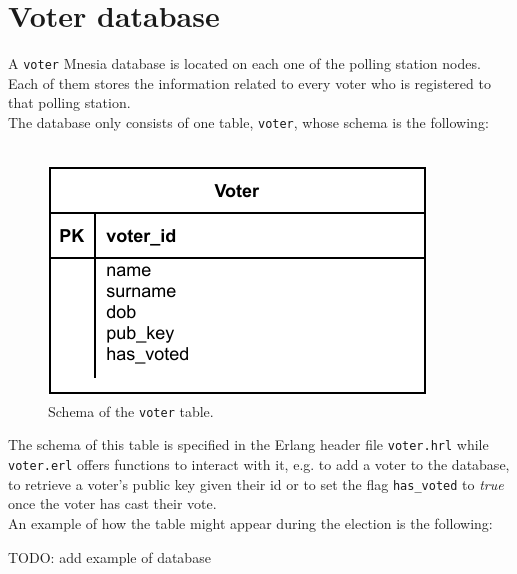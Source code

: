 \section{Voter database}\label{sec:voters_db}
A \texttt{voter} Mnesia database is located on each one of the polling station nodes. Each of them stores the information related to every voter who is registered to that polling station.\\
The database only consists of one table, \texttt{voter}, whose schema is the following:\\
\
\begin{figure}[H]
    \begin{center}
        \includegraphics[scale=1]{img/voter_schema.pdf}
    \end{center}
    \vspace*{-0.5cm}
    \caption{Schema of the \texttt{voter} table.}
    \label{fig:voter_schema}
\end{figure}

The schema of this table is specified in the Erlang header file \texttt{voter.hrl} while \texttt{voter.erl} offers functions to interact with it, e.g. to add a voter to the database, to retrieve a voter's public key given their id or to set the flag \texttt{has\_voted} to \textit{true} once the voter has cast their vote.\\
An example of how the table might appear during the election is the following:

TODO: add example of database
